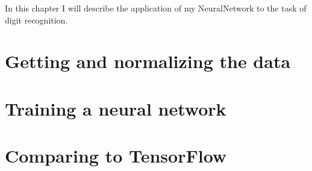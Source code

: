 In this chapter I will describe the application of my NeuralNetwork to the task of digit recognition.

\section{Getting and normalizing the data}


\section{Training a neural network}


\section{Comparing to TensorFlow}

%
% 
